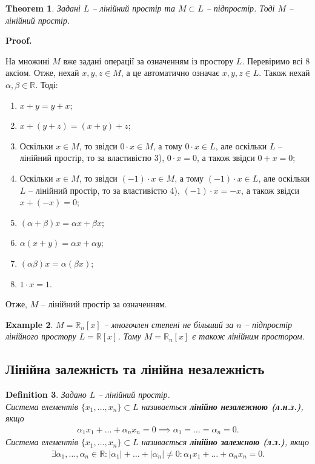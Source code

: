 \documentclass[a4paper, 10pt]{article}
\makeatletter
\theoremstyle{theoremdd}
\newtheorem{theorem}{Theorem}[subsection]
\newtheorem{definition}[theorem]{Definition}
\newtheorem{example}[theorem]{Example}
\renewenvironment{proof}[1][Proof.\\]{\par
\pushQED{\hfill \qed}%
\normalfont \topsep6\p@\@plus6\p@\relax
\trivlist
\item\relax
{\bfseries
#1\@addpunct{.}}\hspace\labelsep\ignorespaces
}{%
\popQED\endtrivlist\@endpefalse
}
\makeatother
\begin{document}
	\begin{theorem}
	Задані $L$ -- лінійний простір та $M \subset L$ -- підпростір. Тоді $M$ -- лінійний простір.
	\end{theorem}
	
	\begin{proof}
	На множині $M$ вже задані операції за означенням із простору $L$. Перевіримо всі 8 аксіом. Отже, нехай $x,y,z \in M$, а це автоматично означає $x,y,z \in L$. Також нехай $\alpha,\beta \in \mathbb{R}$. Тоді:
	\begin{enumerate}[wide = 0pt, nosep, label={\arabic*)}]
	\item $x+y=y+x$;
	\item $x+(y+z)=(x+y)+z$;
	\item Оскільки $x \in M$, то звідси $0\cdot x \in M$, а тому $0 \cdot x \in L$, але оскільки $L$ -- лінійний простір, то за властивістю 3), $0 \cdot x = 0$, а також звідси $0 + x = 0$;
	\item Оскільки $x \in M$, то звідси $(-1) \cdot x \in M$, а тому $(-1) \cdot x \in L$, але оскільки $L$ -- лінійний простір, то за властивістю 4), $(-1) \cdot x = -x$, а також звідси $x + (-x) = 0$;
	\item $(\alpha + \beta)x = \alpha x + \beta x$;
	\item $\alpha (x+y)= \alpha x + \alpha y$;
	\item $(\alpha \beta) x = \alpha (\beta x)$;
	\item $1 \cdot x = 1$.
	\end{enumerate}
	Отже, $M$ -- лінійний простір за означенням.
	\end{proof}

	\begin{example}	
		$M = \mathbb{R}_n[x]$ -- многочлен степені не більший за $n$ -- підпростір лінійного простору $L = \mathbb{R}[x]$. Тому $M = \mathbb{R}_n[x]$ є також лінійним простором.
	\end{example}
	
	\subsection{Лінійна залежність та лінійна незалежність}
	\begin{definition}
	Задано $L$ -- лінійний простір.\\
	Система елементів $\{x_1, \dots, x_n\} \subset L$ називається \textbf{лінійно незалежною (л.н.з.)}, якщо
	\begin{align*}
	\alpha_1 x_1 + \dots + \alpha_n x_n = 0 \implies \alpha_1 = \dots = \alpha_n = 0.
	\end{align*}
	Система елементів $\{x_1, \dots, x_n\} \subset L$ називається \textbf{лінійно залежною (л.з.)}, якщо
	\begin{align*}
	\exists \alpha_1,\dots,\alpha_n \in \mathbb{R}: |\alpha_1| + \dots + |\alpha_n| \neq 0: \alpha_1 x_1 + \dots + \alpha_n x_n = 0.
	\end{align*}
	\end{definition}
	
\end{document}
